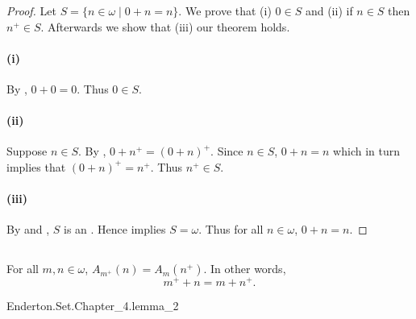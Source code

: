\documentclass{report}
\begin{document}
  \begin{proof}

    Let $S = \{n \in \omega \mid 0 + n = n\}$.
    We prove that (i) $0 \in S$ and (ii) if $n \in S$ then $n^+ \in S$.
    Afterwards we show that (iii) our theorem holds.

    \paragraph{(i)}%

      By , $0 + 0 = 0$.
      Thus $0 \in S$.

    \paragraph{(ii)}%

      Suppose $n \in S$.
      By , $0 + n^+ = (0 + n)^+$.
      Since $n \in S$, $0 + n = n$ which in turn implies that $(0 + n)^+ = n^+$.
      Thus $n^+ \in S$.

    \paragraph{(iii)}%

      By  and
        , $S$ is an
        .
      Hence  implies $S = \omega$.
      Thus for all $n \in \omega$, $0 + n = n$.

  \end{proof}

\subsection{}%

  \begin{lemma}[2]
    For all $m, n \in \omega$, $A_{m^+}(n) = A_m(n^+)$.
    In other words, $$m^+ + n = m + n^+.$$
  \end{lemma}

    {Enderton.Set.Chapter\_4.lemma\_2}

\end{document}
